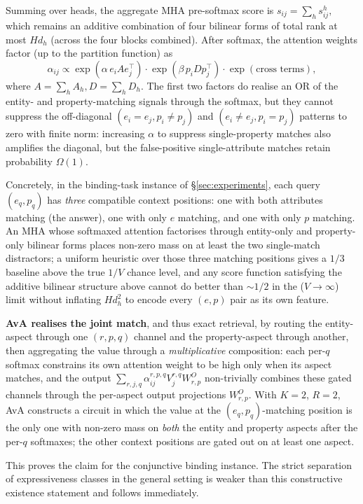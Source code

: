 \documentclass{article}
\begin{document}
Summing over heads, the aggregate MHA pre-softmax score is
\(
  s_{ij} = \sum_h s^h_{ij},
\)
which remains an additive combination of four bilinear forms of
total rank at most $H d_h$ (across the four blocks combined). After
softmax, the attention weights factor (up to the partition function)
as
\[
  \alpha_{ij} \propto \exp(\alpha\, e_i A e_j^\top)
                 \cdot \exp(\beta\, p_i D p_j^\top)
                 \cdot \exp(\text{cross terms}),
\]
where $A = \sum_h A_h, D = \sum_h D_h$. The first two factors do
realise an OR of the entity- and property-matching signals through
the softmax, but they cannot suppress the off-diagonal $(e_i = e_j,
p_i \ne p_j)$ and $(e_i \ne e_j, p_i = p_j)$ patterns to zero with
finite norm: increasing $\alpha$ to suppress single-property matches
also amplifies the diagonal, but the false-positive single-attribute
matches retain probability $\Omega(1)$.

Concretely, in the binding-task instance of \S\ref{sec:experiments},
each query $(e_q, p_q)$ has \emph{three} compatible context
positions: one with both attributes matching (the answer), one with
only $e$ matching, and one with only $p$ matching. An MHA whose
softmaxed attention factorises through entity-only and property-only
bilinear forms places non-zero mass on at least the two single-match
distractors; a uniform heuristic over those three matching positions
gives a $1/3$ baseline above the true $1/V$ chance level, and any
score function satisfying the additive bilinear structure above
cannot do better than $\sim 1/2$ in the ($V \to \infty$) limit
without inflating $H d_h^2$ to encode every $(e, p)$ pair as its
own feature.

\textbf{AvA realises the joint match}, and thus exact retrieval, by
routing the entity-aspect through one $(r, p, q)$ channel and the
property-aspect through another, then aggregating the value through a
\emph{multiplicative} composition: each per-$q$ softmax constrains its
own attention weight to be high only when its aspect matches, and the
output $\sum_{r, j, q} \alpha^{r,p,q}_{ij} V^{r,q}_j W^O_{r,p}$
non-trivially combines these gated channels through the per-aspect
output projections $W^O_{r, p}$. With $K{=}2$, $R{=}2$, AvA
constructs a circuit in which the value at the $(e_q, p_q)$-matching
position is the only one with non-zero mass on \emph{both} the
entity and property aspects after the per-$q$ softmaxes; the other
context positions are gated out on at least one aspect.

This proves the claim for the conjunctive binding instance. The
strict separation of expressiveness classes in the general setting is
weaker than this constructive existence statement and follows
immediately.
\end{document}
